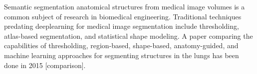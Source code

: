 
Semantic segmentation anatomical structures from medical image volumes is a common subject of research in biomedical engineering. Traditional techniques predating deeplearning for medical image segmentation include thresholding, atlas-based segmentation, and statistical shape modeling. A paper comparing the capabilities of thresholding, region-based, shape-based, anatomy-guided, and machine learning approaches for segmenting structures in the lungs has been done in 2015 [comparison].